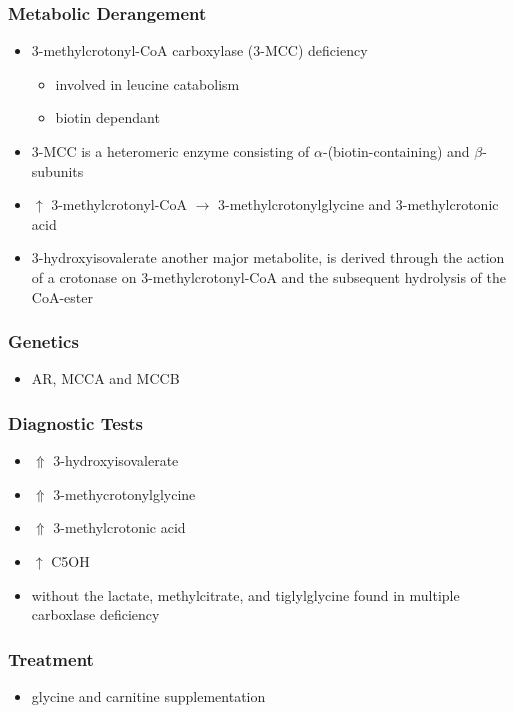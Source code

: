 \documentclass{scrartcl}
\begin{document}
\subsubsection{Metabolic Derangement}
\label{sec:org34a089d}
\begin{itemize}
\item 3-methylcrotonyl-CoA carboxylase (3-MCC) deficiency
\begin{itemize}
\item involved in leucine catabolism
\item biotin dependant
\end{itemize}
\item 3-MCC is a heteromeric enzyme consisting of
\(\alpha\)-(biotin-containing) and \(\beta\)-subunits
\item \(\uparrow\) 3-methylcrotonyl-CoA \(\to\) 3-methylcrotonylglycine and
3-methylcrotonic acid
\item 3-hydroxyisovalerate another major metabolite, is derived
through the action of a crotonase on 3-methylcrotonyl-CoA and the
subsequent hydrolysis of the CoA-ester
\end{itemize}
\subsubsection{Genetics}
\label{sec:org0b45c12}
\begin{itemize}
\item AR, MCCA and MCCB
\end{itemize}
\subsubsection{Diagnostic Tests}
\label{sec:org832603c}
\begin{itemize}
\item \(\Uparrow\) 3-hydroxyisovalerate
\item \(\Uparrow\) 3-methycrotonylglycine
\item \(\Uparrow\) 3-methylcrotonic acid
\item \(\uparrow\) C5OH
\item without the lactate, methylcitrate, and tiglylglycine found in
multiple carboxlase deficiency
\end{itemize}

\subsubsection{Treatment}
\label{sec:orga22851b}
\begin{itemize}
\item glycine and carnitine supplementation
\end{itemize}
\end{document}
